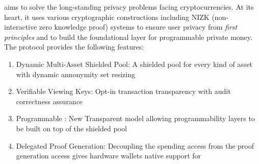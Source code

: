 
\MantaPay{} aims to solve the long-standing privacy problems facing cryptocurrencies. At its heart, it uses various cryptographic constructions including NIZK (non-interactive zero knowledge proof) systems to ensure user privacy from \emph{first principles} and to build the foundational layer for programmable private money. The \MantaPay{} protocol provides the following features:

\begin{enumerate}
    \item Dynamic Multi-Asset Shielded Pool: A shielded pool for every kind of asset with dynamic annonymity set resizing
    \item Verifiable Viewing Keys: Opt-in transaction transparency with audit correctness assurance
    \item Programmable : New Transparent \UTXO{} model allowing programmability layers to be built on top of the shielded pool
    \item Delegated Proof Generation: Decoupling the spending access from the proof generation access gives hardware wallets native support for 
\end{enumerate}

